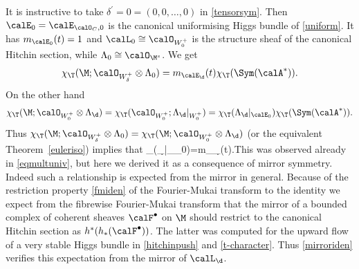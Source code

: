 \begin{remark}
\notready  \label{mirrorate0}
	It is instructive to take $\delta^\prime=0=(0,0,\dots,0)$ in \eqref{tensorsym}. Then $\calE_{0}=\calE_{\calO_C,0}$ is the canonical uniformising Higgs bundle of  \eqref{uniform}. It has $m_{\calE_0}(t)=1$ and $\calL_{0}\cong \calO_{W^+_0}$ is the structure sheaf of the canonical Hitchin section, while $\Lambda_0\cong \calO_{\M^s}$.   We get $$\chi_\T(\M;\calO_{W_{\delta}^+}\otimes \Lambda_{0})= m_{\calE_{\d}}(t)\chi_\T(\Sym(\calA^*)).$$   On the other hand $$\chi_\T(\M;\calO_{W_0^+}\otimes \Lambda_{\d})=\chi_\T(\calO_{W_0^+};\Lambda_{\d}|_{W_0^+})=\chi_\T(\Lambda_{\d}|_{\calE_0})\chi_\T(\Sym(\calA^*)).$$ Thus $\chi_\T(\M;\calO_{W_{\delta}^+}\otimes \Lambda_{0})=\chi_\T(\M;\calO_{W_0^+}\otimes \Lambda_{\d})$ (or the equivalent Theorem~\ref{euleriso}) implies that \beq \label{mirroriden} \chi_\T(\Lambda_{\d}|_{\calE_0})=m_{\calE_{\d}}(t).\eeq This was observed already in \eqref{eqmultuniv}, but here we derived it as a consequence of mirror symmetry. Indeed such a relationship is expected from the mirror in general. Because  of the restriction property \eqref{fmiden} of the Fourier-Mukai transform to the identity we expect from the fibrewise Fourier-Mukai transform that the mirror of a bounded complex of coherent sheaves $\calF^\bullet$ on $\M$ should restrict to the canonical Hitchin section as $h^*(h_*(\calF^\bullet) )$. The latter was computed for the upward flow of a very stable Higgs bundle in \eqref{hitchinpush} and \eqref{t-character}. Thus \eqref{mirroriden} verifies this expectation from the mirror of $\calL_{\d}$.
\end{remark}

